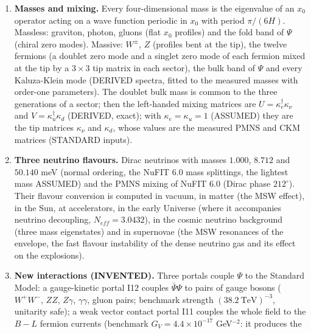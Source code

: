 \documentclass[
  10pt,
]{article}
\begin{document}
\begin{enumerate}
  \((c, s)\), \((t, b)\), and of leptons, \((\nu_e, e)\),
  \((\nu_\mu, \mu)\), \((\nu_\tau, \tau)\), each generation with a
  right-handed neutrino. The gauge anomalies cancel generation by
  generation. Electroweak symmetry is broken at the regular tip of the
  hidden direction by a non-linear sigma field \(\Sigma \in SU(2)\) that
  has no radial mode, hence no Higgs particle.
\item
  \textbf{Masses and mixing.} Every four-dimensional mass is the
  eigenvalue of an \(x_0\) operator acting on a wave function periodic
  in \(x_0\) with period \(\pi/(6H)\). Massless: graviton, photon,
  gluons (flat \(x_0\) profiles) and the fold band of \(\Psi\) (chiral
  zero modes). Massive: \(W^\pm\), \(Z\) (profiles bent at the tip), the
  twelve fermions (a doublet zero mode and a singlet zero mode of each
  fermion mixed at the tip by a \(3\times3\) tip matrix in each sector),
  the bulk band of \(\Psi\) and every Kaluza-Klein mode (DERIVED
  spectra, fitted to the measured masses with order-one parameters). The
  doublet bulk mass is common to the three generations of a sector; then
  the left-handed mixing matrices are \(U = \kappa_e^\dagger\kappa_\nu\)
  and \(V = \kappa_u^\dagger\kappa_d\) (DERIVED, exact); with
  \(\kappa_e = \kappa_u = 1\) (ASSUMED) they are the tip matrices
  \(\kappa_\nu\) and \(\kappa_d\), whose values are the measured PMNS
  and CKM matrices (STANDARD inputs).
\item
  \textbf{Three neutrino flavours.} Dirac neutrinos with masses
  \(1.000\), \(8.712\) and \(50.140\) meV (normal ordering, the NuFIT
  6.0 mass splittings, the lightest mass ASSUMED) and the PMNS mixing of
  NuFIT 6.0 (Dirac phase \(212^\circ\)). Their flavour conversion is
  computed in vacuum, in matter (the MSW effect), in the Sun, at
  accelerators, in the early Universe (where it accompanies neutrino
  decoupling, \(N_{eff} = 3.0432\)), in the cosmic neutrino background
  (three mass eigenstates) and in supernovae (the MSW resonances of the
  envelope, the fast flavour instability of the dense neutrino gas and
  its effect on the explosions).
\item
  \textbf{New interactions (INVENTED).} Three portals couple \(\Psi\) to
  the Standard Model: a gauge-kinetic portal I12 couples
  \(\bar\Psi\Psi\) to pairs of gauge bosons (\(W^+W^-\), \(ZZ\),
  \(Z\gamma\), \(\gamma\gamma\), gluon pairs; benchmark strength
  \((38.2\ \text{TeV})^{-3}\), unitarity safe); a weak vector contact
  portal I11 couples the whole field to the \(B - L\) fermion currents
  (benchmark \(G_V = 4.4\times10^{-17}\) GeV\(^{-2}\): it produces the

\end{enumerate}
\end{document}
